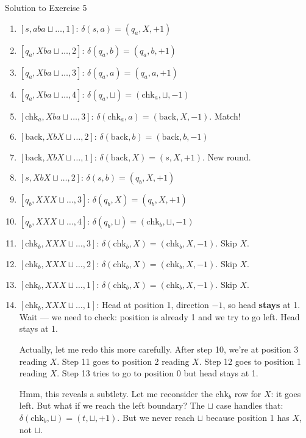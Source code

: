 \documentclass[11pt,a4paper]{article}
\newcommand{\blank}{\sqcup}
\begin{document}
\begin{solutionbox}{Solution to Exercise 5}
\begin{enumerate}[label=\arabic*.]
    \item $[s, aba\blank\ldots, 1]$: $\delta(s, a) = (q_a, X, +1)$
    \item $[q_a, Xba\blank\ldots, 2]$: $\delta(q_a, b) = (q_a, b, +1)$
    \item $[q_a, Xba\blank\ldots, 3]$: $\delta(q_a, a) = (q_a, a, +1)$
    \item $[q_a, Xba\blank\ldots, 4]$: $\delta(q_a, \blank) = (\text{chk}_a, \blank, -1)$
    \item $[\text{chk}_a, Xba\blank\ldots, 3]$: $\delta(\text{chk}_a, a) = (\text{back}, X, -1)$. Match!
    \item $[\text{back}, XbX\blank\ldots, 2]$: $\delta(\text{back}, b) = (\text{back}, b, -1)$
    \item $[\text{back}, XbX\blank\ldots, 1]$: $\delta(\text{back}, X) = (s, X, +1)$. New round.
    \item $[s, XbX\blank\ldots, 2]$: $\delta(s, b) = (q_b, X, +1)$
    \item $[q_b, XXX\blank\ldots, 3]$: $\delta(q_b, X) = (q_b, X, +1)$
    \item $[q_b, XXX\blank\ldots, 4]$: $\delta(q_b, \blank) = (\text{chk}_b, \blank, -1)$
    \item $[\text{chk}_b, XXX\blank\ldots, 3]$: $\delta(\text{chk}_b, X) = (\text{chk}_b, X, -1)$. Skip $X$.
    \item $[\text{chk}_b, XXX\blank\ldots, 2]$: $\delta(\text{chk}_b, X) = (\text{chk}_b, X, -1)$. Skip $X$.
    \item $[\text{chk}_b, XXX\blank\ldots, 1]$: $\delta(\text{chk}_b, X) = (\text{chk}_b, X, -1)$. Skip $X$.
    \item $[\text{chk}_b, XXX\blank\ldots, 1]$: Head at position 1, direction $-1$, so head \textbf{stays} at 1. Wait --- we need to check: position is already 1 and we try to go left. Head stays at 1.

    Actually, let me redo this more carefully. After step 10, we're at position 3 reading $X$. Step 11 goes to position 2 reading $X$. Step 12 goes to position 1 reading $X$. Step 13 tries to go to position 0 but head stays at 1.

    Hmm, this reveals a subtlety. Let me reconsider the $\text{chk}_b$ row for $X$: it goes left. But what if we reach the left boundary? The $\blank$ case handles that: $\delta(\text{chk}_b, \blank) = (t, \blank, +1)$. But we never reach $\blank$ because position 1 has $X$, not $\blank$.


\end{enumerate}
\end{solutionbox}
\end{document}
